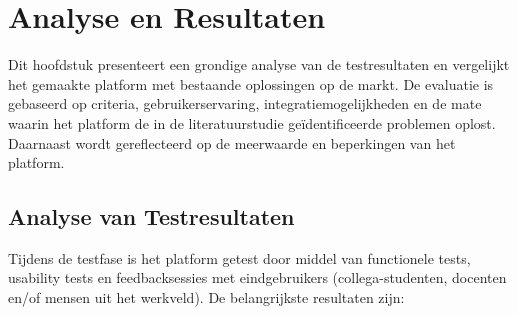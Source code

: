 \chapter{Analyse en Resultaten}
\label{ch:analyse}

Dit hoofdstuk presenteert een grondige analyse van de testresultaten en vergelijkt het gemaakte platform met bestaande oplossingen op de markt. De evaluatie is gebaseerd op criteria, gebruikerservaring, integratiemogelijkheden en de mate waarin het platform de in de literatuurstudie geïdentificeerde problemen oplost. Daarnaast wordt gereflecteerd op de meerwaarde en beperkingen van het platform.

\section{Analyse van Testresultaten}
\label{sec:analyse-resultaten}

Tijdens de testfase is het platform getest door middel van functionele tests, usability tests en feedbacksessies met eindgebruikers (collega-studenten, docenten en/of mensen uit het werkveld). De belangrijkste resultaten zijn:


